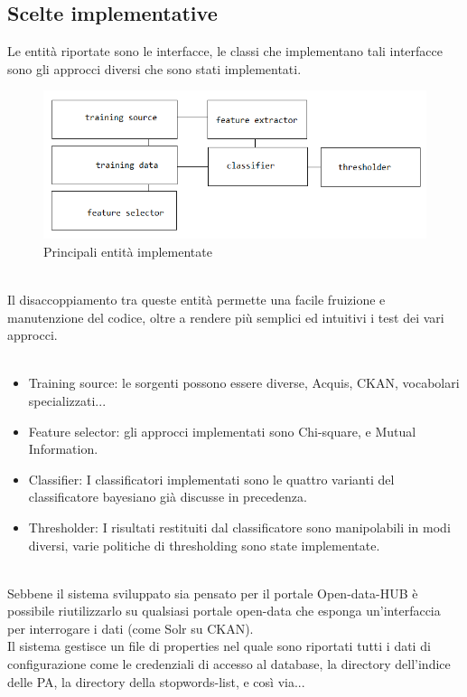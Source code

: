 \documentclass{article}
\theoremstyle{plain}
\theoremstyle{definition}
\begin{document}
\subsection{Scelte implementative}
Le entità riportate sono le interfacce, le classi che implementano tali interfacce sono gli approcci diversi che sono stati implementati.
\begin{figure}[htbp]
\begin{center}
\includegraphics[scale=1.00]{img/entita.png}
\caption{Principali entità implementate}
\end{center}
\end{figure}
\\
Il disaccoppiamento tra queste entità permette una facile fruizione e manutenzione del codice, oltre a rendere più semplici ed intuitivi i test dei vari approcci.
\\
\\
\begin{itemize}
\item Training source: le sorgenti possono essere diverse, Acquis, CKAN, vocabolari specializzati...
\item Feature selector: gli approcci implementati sono Chi-square, e Mutual Information.
\item Classifier: I classificatori implementati sono le quattro varianti del classificatore bayesiano già discusse in precedenza.
\item Thresholder: I risultati restituiti dal classificatore sono manipolabili in modi diversi, varie politiche di thresholding sono state implementate.
\end{itemize}
\phantom
\\
Sebbene il sistema sviluppato sia pensato per il portale Open-data-HUB è possibile riutilizzarlo su qualsiasi portale open-data che esponga un'interfaccia per interrogare i dati (come Solr su CKAN).
\\
Il sistema gestisce un file di properties nel quale sono riportati tutti i dati di configurazione come le credenziali di accesso al database, la directory dell'indice delle PA, la directory della stopwords-list, e così via...
\end{document}
